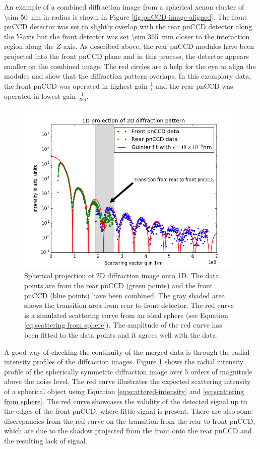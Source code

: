 An example of a combined diffraction image from a spherical xenon cluster of \SI{\sim 50}{\nano\meter} in radius is shown in Figure \ref{fig:pnCCD-image-aligned}. The front pnCCD detector was set to slightly overlap with the rear pnCCD detector along the $Y$-axis but the front detector was set \SI{\sim 365}{\milli\meter} closer to the interaction region along the $Z$-axis. As described above, the rear pnCCD modules have been projected into the front pnCCD plane and in this process, the detector appears smaller on the combined image. The red circles are a help for the eye to align the modules and show that the diffraction pattern overlaps. In this exemplary data, the front pnCCD was operated in highest gain $\frac{1}{1}$ and the rear pnCCD was operated in lowest gain $\frac{1}{256}$.\\[1\baselineskip]
\begin{figure}
	\centering
		\includegraphics[height=0.50\textwidth]{images/pnCCD-1d-sum.png}
	\caption[Spherical projection of 2D diffraction image onto 1D.]{Spherical projection of 2D diffraction image onto 1D. The data points are from the rear pnCCD (green points) and the front pnCCD (blue points) have been combined. The gray shaded area shows the transition area from rear to front detector. The red curve is a simulated scattering curve from an ideal sphere (see Equation \eqref{eq:scattering from sphere}). The amplitude of the red curve has been fitted to the data points and it agrees well with the data.}
	\label{fig:pnCCD-1d-sum}
\end{figure}
A good way of checking the continuity of the merged data is through the radial intensity profiles of the diffraction images. Figure \ref{fig:pnCCD-1d-sum} shows the radial intensity profile of the spherically symmetric diffraction image over 5 orders of magnitude above the noise level. The red curve illustrates the expected scattering intensity of a spherical object using Equation \eqref{eq:scattered-intensity} and \eqref{eq:scattering from sphere}. The red curve showcases the validity of the detected signal up to the edges of the front pnCCD, where little signal is present. There are also some discrepancies from the red curve on the transition from the rear to front pnCCD, which are due to the shadow projected from the front onto the rear pnCCD and the resulting lack of signal. 
%
%
%
